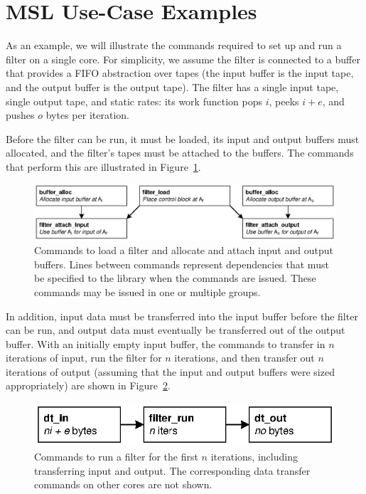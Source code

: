 \section{MSL Use-Case Examples}

As an example, we will illustrate the commands required to set up and
run a filter on a single core. For simplicity, we assume the filter is
connected to a buffer that provides a FIFO abstraction over tapes (the
input buffer is the input tape, and the output buffer is the output
tape). The filter has a single input tape, single output tape, and
static rates: its work function pops $i$, peeks $i+e$, and pushes $o$
bytes per iteration.

Before the filter can be run, it must be loaded, its input and output
buffers must allocated, and the filter's tapes must be attached to the
buffers. The commands that perform this are illustrated in
Figure~\ref{fig:lib:init}.

\begin{figure}[!htb]
\begin{center}
\includegraphics[scale=.55]{figs/init}
\end{center}
\caption[Commands to set up a filter.]{Commands to load a filter and allocate and attach input and output buffers. Lines between commands represent dependencies that must be specified to the library when the commands are issued. These commands may be issued in one or multiple groups.}
\label{fig:lib:init}
\end{figure}

In addition, input data must be transferred into the input buffer before the filter can be run, and output data must eventually be transferred out of the output buffer. With an initially empty input buffer, the commands to transfer in $n$ iterations of input, run the filter for $n$ iterations, and then transfer out $n$ iterations of output (assuming that the input and output buffers were sized appropriately) are shown in Figure~\ref{fig:lib:run}.

\begin{figure}[!htb]
\begin{center}
\includegraphics{figs/run}
\end{center}
\caption[Commands to run a filter.]{Commands to run a filter for the
  first $n$ iterations, including transferring input and output. The
  corresponding data transfer commands on other cores are not shown.}
\label{fig:lib:run}
\end{figure}

